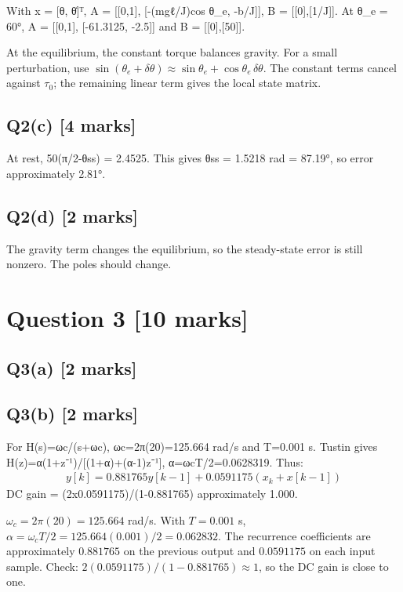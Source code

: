 \documentclass[11pt,a4paper]{article}
\begin{document}
With x = [θ, θ̇]ᵀ, A = [[0,1], [-(mgℓ/J)cos θ\_e, -b/J]], B = [[0],[1/J]].
At θ\_e = 60°, A = [[0,1], [-61.3125, -2.5]] and B = [[0],[50]].\par\smallskip At the equilibrium, the constant torque balances gravity. For a small perturbation, use $\sin(\theta_e+\delta\theta)\approx\sin\theta_e+\cos\theta_e\,\delta\theta$. The constant terms cancel against $\tau_0$; the remaining linear term gives the local state matrix.

\subsection*{Q2(c) \hfill [4 marks]}

At rest, 50(π/2-θss) = 2.4525.
This gives θss = 1.5218 rad = 87.19°, so error approximately 2.81°.

\subsection*{Q2(d) \hfill [2 marks]}

The gravity term changes the equilibrium, so the steady-state error is still nonzero.
The poles should change.

\section*{Question 3 \hfill [10 marks]}
\subsection*{Q3(a) \hfill [2 marks]}

\vspace{2mm}

\subsection*{Q3(b) \hfill [2 marks]}

For H(s)=ωc/(s+ωc), ωc=2π(20)=125.664 rad/s and T=0.001 s.
Tustin gives H(z)=α(1+z⁻¹)/[(1+α)+(α-1)z⁻¹], α=ωcT/2=0.0628319.
Thus:\[\begin{aligned}y[k]=0.881765y[k-1]+0.0591175(x_k+x[k-1])\end{aligned}\]
DC gain = (2x0.0591175)/(1-0.881765) approximately 1.000.\par\smallskip $\omega_c=2\pi(20)=125.664$ rad/s. With $T=0.001$ s, $\alpha=\omega_cT/2=125.664(0.001)/2=0.062832$. The recurrence coefficients are approximately $0.881765$ on the previous output and $0.0591175$ on each input sample. Check: $2(0.0591175)/(1-0.881765)\approx1$, so the DC gain is close to one.
\end{document}
